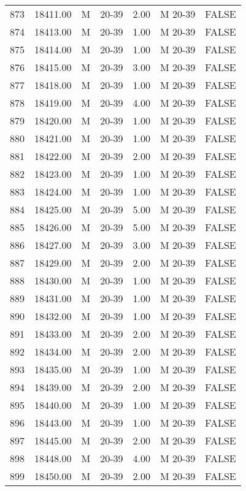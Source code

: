 \begin{table}[ht]
\begin{tabular}{rrllrll}
  873 & 18411.00 & M & 20-39 & 2.00 & M 20-39 & FALSE \\ 
  874 & 18413.00 & M & 20-39 & 1.00 & M 20-39 & FALSE \\ 
  875 & 18414.00 & M & 20-39 & 1.00 & M 20-39 & FALSE \\ 
  876 & 18415.00 & M & 20-39 & 3.00 & M 20-39 & FALSE \\ 
  877 & 18418.00 & M & 20-39 & 1.00 & M 20-39 & FALSE \\ 
  878 & 18419.00 & M & 20-39 & 4.00 & M 20-39 & FALSE \\ 
  879 & 18420.00 & M & 20-39 & 1.00 & M 20-39 & FALSE \\ 
  880 & 18421.00 & M & 20-39 & 1.00 & M 20-39 & FALSE \\ 
  881 & 18422.00 & M & 20-39 & 2.00 & M 20-39 & FALSE \\ 
  882 & 18423.00 & M & 20-39 & 1.00 & M 20-39 & FALSE \\ 
  883 & 18424.00 & M & 20-39 & 1.00 & M 20-39 & FALSE \\ 
  884 & 18425.00 & M & 20-39 & 5.00 & M 20-39 & FALSE \\ 
  885 & 18426.00 & M & 20-39 & 5.00 & M 20-39 & FALSE \\ 
  886 & 18427.00 & M & 20-39 & 3.00 & M 20-39 & FALSE \\ 
  887 & 18429.00 & M & 20-39 & 2.00 & M 20-39 & FALSE \\ 
  888 & 18430.00 & M & 20-39 & 1.00 & M 20-39 & FALSE \\ 
  889 & 18431.00 & M & 20-39 & 1.00 & M 20-39 & FALSE \\ 
  890 & 18432.00 & M & 20-39 & 1.00 & M 20-39 & FALSE \\ 
  891 & 18433.00 & M & 20-39 & 2.00 & M 20-39 & FALSE \\ 
  892 & 18434.00 & M & 20-39 & 2.00 & M 20-39 & FALSE \\ 
  893 & 18435.00 & M & 20-39 & 1.00 & M 20-39 & FALSE \\ 
  894 & 18439.00 & M & 20-39 & 2.00 & M 20-39 & FALSE \\ 
  895 & 18440.00 & M & 20-39 & 1.00 & M 20-39 & FALSE \\ 
  896 & 18443.00 & M & 20-39 & 1.00 & M 20-39 & FALSE \\ 
  897 & 18445.00 & M & 20-39 & 2.00 & M 20-39 & FALSE \\ 
  898 & 18448.00 & M & 20-39 & 4.00 & M 20-39 & FALSE \\ 
  899 & 18450.00 & M & 20-39 & 2.00 & M 20-39 & FALSE \\ 

\end{tabular}
\end{table}
